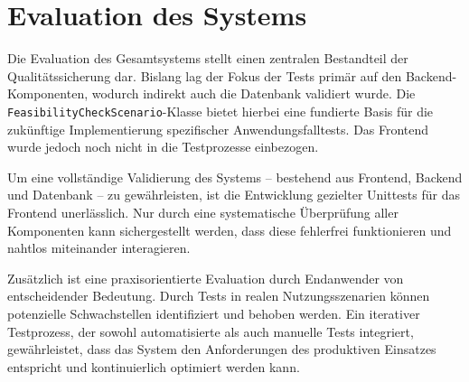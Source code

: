 \section{Evaluation des Systems}

Die Evaluation des Gesamtsystems stellt einen zentralen Bestandteil der Qualitätssicherung dar. Bislang lag der Fokus der Tests primär auf den Backend-Komponenten, wodurch indirekt auch die Datenbank validiert wurde. Die \texttt{FeasibilityCheckScenario}-Klasse bietet hierbei eine fundierte Basis für die zukünftige Implementierung spezifischer Anwendungsfalltests. Das Frontend wurde jedoch noch nicht in die Testprozesse einbezogen.

Um eine vollständige Validierung des Systems – bestehend aus Frontend, Backend und Datenbank – zu gewährleisten, ist die Entwicklung gezielter Unittests für das Frontend unerlässlich. Nur durch eine systematische Überprüfung aller Komponenten kann sichergestellt werden, dass diese fehlerfrei funktionieren und nahtlos miteinander interagieren.

Zusätzlich ist eine praxisorientierte Evaluation durch Endanwender von entscheidender Bedeutung. Durch Tests in realen Nutzungsszenarien können potenzielle Schwachstellen identifiziert und behoben werden. Ein iterativer Testprozess, der sowohl automatisierte als auch manuelle Tests integriert, gewährleistet, dass das System den Anforderungen des produktiven Einsatzes entspricht und kontinuierlich optimiert werden kann.
